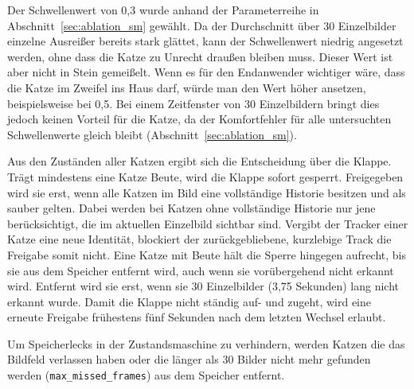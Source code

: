 Der Schwellenwert von 0,3 wurde anhand der Parameterreihe in Abschnitt~\ref{sec:ablation_sm} gewählt. Da der Durchschnitt über 30 Einzelbilder einzelne Ausreißer bereits stark glättet, kann der Schwellenwert niedrig angesetzt werden, ohne dass die Katze zu Unrecht draußen bleiben muss. Dieser Wert ist aber nicht in Stein gemeißelt. Wenn es für den Endanwender wichtiger wäre, dass die Katze im Zweifel ins Haus darf, würde man den Wert höher ansetzen, beispielsweise bei 0,5. Bei einem Zeitfenster von 30 Einzelbildern bringt dies jedoch keinen Vorteil für die Katze, da der Komfortfehler für alle untersuchten Schwellenwerte gleich bleibt (Abschnitt~\ref{sec:ablation_sm}).

Aus den Zuständen aller Katzen ergibt sich die Entscheidung über die Klappe. Trägt mindestens eine Katze Beute, wird die Klappe sofort gesperrt. Freigegeben wird sie erst, wenn alle Katzen im Bild eine vollständige Historie besitzen und als sauber gelten. Dabei werden bei Katzen ohne vollständige Historie nur jene berücksichtigt, die im aktuellen Einzelbild sichtbar sind. Vergibt der Tracker einer Katze eine neue Identität, blockiert der zurückgebliebene, kurzlebige Track die Freigabe somit nicht. Eine Katze mit Beute hält die Sperre hingegen aufrecht, bis sie aus dem Speicher entfernt wird, auch wenn sie vorübergehend nicht erkannt wird. Entfernt wird sie erst, wenn sie 30 Einzelbilder (3,75 Sekunden) lang nicht erkannt wurde. Damit die Klappe nicht ständig auf- und zugeht, wird eine erneute Freigabe frühestens fünf Sekunden nach dem letzten Wechsel erlaubt.

Um Speicherlecks in der Zustandsmaschine zu verhindern, werden Katzen die das Bildfeld verlassen haben oder die länger als 30 Bilder nicht mehr gefunden werden (\texttt{max\_missed\_frames}) aus dem Speicher entfernt.

